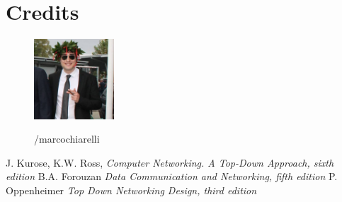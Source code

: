\documentclass[11 pt,a4paper,twoside,openany]{book}
\begin{document}
\newpage

\section*{Credits}

\begin{figure}[h]
\includegraphics[width=3cm]{figures/marco.jpg}
\vspace{0.3cm}

%
\hspace{0.05cm} /marcochiarelli

\end{figure}



\begin{thebibliography}{100}
 J. Kurose, K.W. Ross, \emph{Computer Networking. A Top-Down Approach,  sixth edition}
 B.A. Forouzan \emph{Data Communication and Networking, fifth edition}
 P. Oppenheimer \emph{Top Down Networking Design, third edition}
\end{thebibliography}
\end{document}
